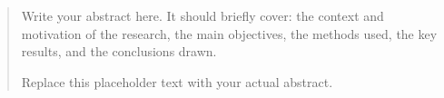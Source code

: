 

\begin{abstract}
    Write your abstract here. It should briefly cover:
    the context and motivation of the research,
    the main objectives,
    the methods used,
    the key results,
    and the conclusions drawn.

    Replace this placeholder text with your actual abstract.
\end{abstract}

